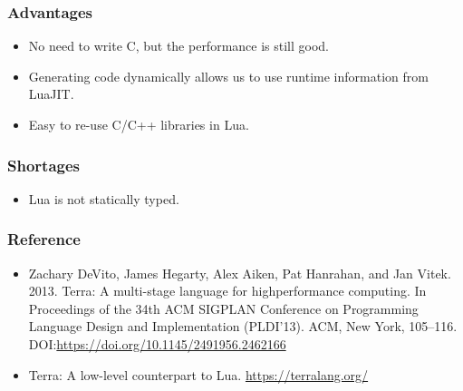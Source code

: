 \documentclass{beamer}
\begin{document}
\begin{frame}
	\frametitle{Advantages}
  \begin{itemize}
  \item No need to write C, but the performance is still good.\pause
  \item Generating code dynamically allows us to use runtime information from LuaJIT.\pause
  \item Easy to re-use C/C++ libraries in Lua.\pause
  \end{itemize}
\end{frame}

\begin{frame}
	\frametitle{Shortages}
  \begin{itemize}
  \item Lua is not statically typed.
  \end{itemize}
\end{frame}

\begin{frame}
	\frametitle{Reference}
  \begin{itemize}
  \item Zachary DeVito, James Hegarty, Alex Aiken, Pat Hanrahan, and Jan Vitek. 2013. Terra: A multi-stage language for highperformance computing. In Proceedings of the 34th ACM SIGPLAN Conference on Programming Language Design and Implementation (PLDI’13). ACM, New York, 105–116. DOI:\url{https://doi.org/10.1145/2491956.2462166}
  \item Terra: A low-level counterpart to Lua. \url{https://terralang.org/}
  \end{itemize}
\end{frame}
\end{document}
